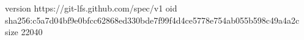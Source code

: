 version https://git-lfs.github.com/spec/v1
oid sha256:c5a7d04bf9e0bfcc62868ed330bde7f99f4d4ce5778e754ab055b598c49a4a2c
size 22040

